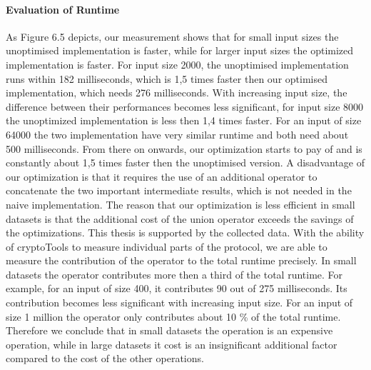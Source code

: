 \paragraph{Evaluation of Runtime}
As Figure 6.5 depicts, our measurement shows that for small input sizes the unoptimised implementation is faster, while for larger input sizes the optimized implementation is faster.  For input size 2000, the unoptimised implementation runs within 182 milliseconds, which is 1,5 times faster then our optimised implementation, which needs 276 milliseconds. With increasing input size, the difference between their performances becomes less significant, for input size 8000 the unoptimized implementation is less then 1,4 times faster. For an input of size 64000 the two implementation have very similar runtime and both need about 500 milliseconds. From there on onwards, our optimization starts to pay of and is constantly about 1,5 times faster then the unoptimised version.  
A disadvantage of our optimization is that it requires the use of an additional  operator to concatenate the two important intermediate results, which is not needed in the naive implementation. The reason that our optimization is less efficient in small datasets is that the additional cost of the union operator exceeds the savings of the optimizations. This thesis is supported by the collected data. With the ability of cryptoTools to measure individual parts of the protocol, we are able to measure the contribution of the  operator to the total runtime precisely. In small datasets the  operator contributes more then a third of the total runtime. For example, for an input of size 400, it contributes 90 out of 275 milliseconds. Its contribution becomes less significant with increasing input size. For an input of size 1 million the  operator only contributes about 10 \% of the total runtime. Therefore we conclude that in small datasets the  operation is an expensive operation, while in large datasets it cost is an insignificant additional factor compared to the cost of the other operations. 

